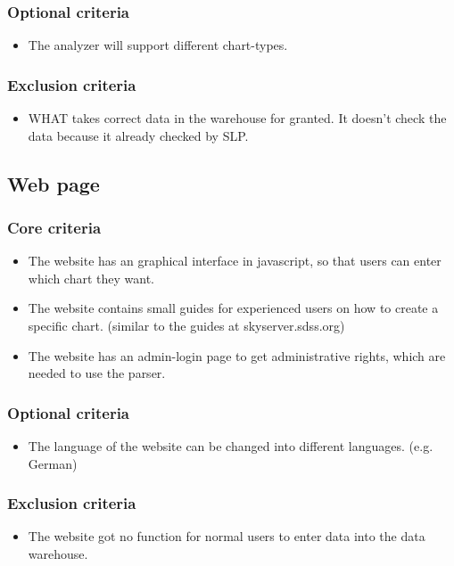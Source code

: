 \subsubsection{Optional criteria}
\begin{itemize}
\item The analyzer will support different chart-types.
\end{itemize}

\subsubsection{Exclusion criteria}
\begin{itemize}
\item WHAT takes correct data in the warehouse for granted. It doesn't check the
 data because it already checked by SLP. 
\end{itemize}

\subsection{Web page}
\subsubsection{Core criteria}
\begin{itemize}
\item The website has an graphical interface in javascript, so that users can enter which chart they want.

\item The website contains small guides for experienced users on how to create a specific chart. 
(similar to the guides at skyserver.sdss.org)

\item The website has an admin-login page to get administrative rights, which are needed to use the parser.
\end{itemize}

\subsubsection{Optional criteria}
\begin{itemize}
\item The language of the website can be changed into different languages. (e.g. German)
\end{itemize}

\subsubsection{Exclusion criteria}
\begin{itemize}
\item The website got no function for normal users to enter data into the data warehouse.
\end{itemize}


